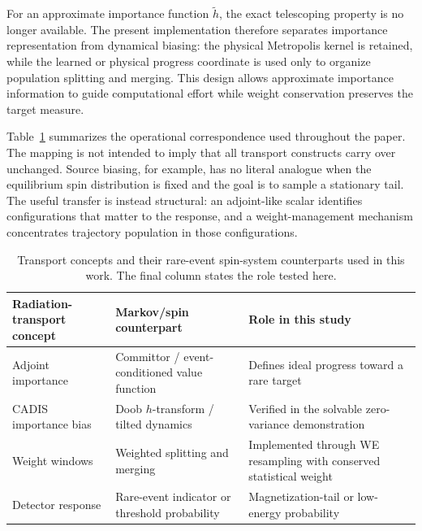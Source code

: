 \documentclass[a4paper,fleqn]{cas-sc}
\begin{document}
For an approximate importance function $\tilde h$, the exact telescoping property is no
longer available. The present implementation therefore separates importance representation
from dynamical biasing: the physical Metropolis kernel is retained, while the learned or
physical progress coordinate is used only to organize population splitting and merging. This
design allows approximate importance information to guide computational effort while weight
conservation preserves the target measure.

Table~\ref{tab:map} summarizes the operational correspondence used throughout the paper. The
mapping is not intended to imply that all transport constructs carry over unchanged. Source
biasing, for example, has no literal analogue when the equilibrium spin distribution is fixed
and the goal is to sample a stationary tail. The useful transfer is instead structural: an
adjoint-like scalar identifies configurations that matter to the response, and a
weight-management mechanism concentrates trajectory population in those configurations.

\begin{table}[H]
\centering\small
\caption{Transport concepts and their rare-event spin-system counterparts used in this work.
The final column states the role tested here.}
\label{tab:map}
\begin{tabular}{p{}p{}p{}}
\toprule
Radiation-transport concept & Markov/spin counterpart & Role in this study \\
\midrule
Adjoint importance & Committor / event-conditioned value function & Defines ideal progress
toward a rare target \\
CADIS importance bias & Doob $h$-transform / tilted dynamics & Verified in the solvable
zero-variance demonstration \\
Weight windows & Weighted splitting and merging & Implemented through WE resampling with
conserved statistical weight \\
Detector response & Rare-event indicator or threshold probability & Magnetization-tail or
low-energy probability \\
\bottomrule
\end{tabular}
\end{table}
\end{document}
